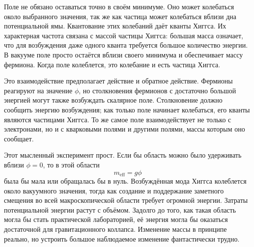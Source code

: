 Поле не обязано оставаться точно в своём минимуме. Оно может колебаться около выбранного значения, так же как частица может колебаться вблизи дна потенциальной ямы. Квантование этих колебаний даёт кванты Хиггса. Их характерная частота связана с массой частицы Хиггса: большая масса означает, что для возбуждения даже одного кванта требуется большое количество энергии. В вакууме поле просто остаётся вблизи своего минимума и обеспечивает массу фермиона. Когда поле колеблется, это колебание и есть частица Хиггса.

Это взаимодействие предполагает действие и обратное действие. Фермионы реагируют на значение \(\phi\), но столкновения фермионов с достаточно большой энергией могут также возбуждать скалярное поле. Столкновение должно сообщить энергию возбуждения; как только поле начинает колебаться, его кванты являются частицами Хиггса. То же самое поле взаимодействует не только с электронами, но и с кварковыми полями и другими полями, массы которым оно сообщает.

\begin{classroomqa}
\end{classroomqa}

Этот мысленный эксперимент прост. Если бы область можно было удерживать вблизи \(\phi=0\), то в этой области
\begin{equation}
m_{\mathrm{eff}}=g\phi
\end{equation}
была бы мала или обращалась бы в нуль. Возбуждённая мода Хиггса колеблется около вакуумного значения, тогда как создание и поддержание заметного смещения во всей макроскопической области требует огромной энергии. Затраты потенциальной энергии растут с объёмом. Задолго до того, как такая область могла бы стать практической лабораторией, её энергия могла бы оказаться достаточной для гравитационного коллапса. Изменение массы в принципе реально, но устроить большое наблюдаемое изменение фантастически трудно.

\begin{classroomqa}
\end{classroomqa}

